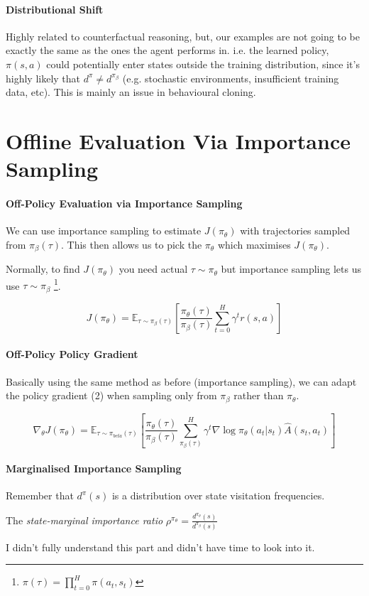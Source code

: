 \documentclass{article}
\begin{document}
\paragraph{Distributional Shift} Highly related to counterfactual reasoning, but, our examples are not going to be exactly the same as the ones the agent performs in. i.e. the learned policy, \( \pi(s,a) \) could potentially enter states outside the training distribution, since it's highly likely that \(d^{\pi} \ne d^{\pi_{\beta}}\) (e.g. stochastic environments, insufficient training data, etc). This is mainly an issue in behavioural cloning.

\section{Offline Evaluation Via Importance Sampling}

\paragraph{Off-Policy Evaluation via Importance Sampling} We can use importance sampling to estimate \(J(\pi_{\theta})\) with trajectories sampled from \(\pi_{\beta} (\tau)\). This then allows us to pick the \(\pi_{\theta}\) which maximises \(J(\pi_{\theta})\).


Normally, to find \(J(\pi_{\theta})\) you need actual \(\tau \sim \pi_{\theta} \) but importance sampling lets us use \(\tau \sim \pi_{\beta}\) \footnote{\(\pi(\tau) = \prod_{t=0}^{H} \pi(a_{t}, s_{t}) \)}.

\begin{equation}
\label{eq:4}
  J(\pi_{\theta}) = \mathbb{E}_{\tau \sim \pi_{\beta}(\tau)} \left [ \frac{\pi_{\theta}(\tau)}{\pi_{\beta}(\tau)} \sum_{t=0}^{H}\gamma^{t}r(s,a) \right ]
\end{equation}

\paragraph{Off-Policy Policy Gradient} Basically using the same method as before (importance sampling), we can adapt the policy gradient (2) when sampling only from \(\pi_{\beta}\) rather than \(\pi_{\theta}\).

\begin{equation}
  \label{eq:5}
  \nabla_{\theta} J(\pi_{\theta}) = \mathbb{E}_{\tau \sim \pi_{beta}(\tau)} \left [ \frac{\pi_{\theta}(\tau)}{\pi_{\beta}(\tau)} \sum_{\pi_{\beta}(\tau)}^{H} \gamma ^{t} \nabla \log \pi_{\theta}(a_{t}|s_{t})\hat{A}(s_{t},a_{t})  \right]
  \end{equation}

  \paragraph{Marginalised Importance Sampling} Remember that \(d^{\pi}(s)\) is a distribution over state visitation frequencies.

  The \emph{state-marginal importance ratio} \(\rho^{\pi_{\theta}}= \frac{d^{\pi_{\theta}}(s)}{d^{\pi_{\beta}}(s)} \)


  I didn't fully understand this part and didn't have time to look into it.
\end{document}
